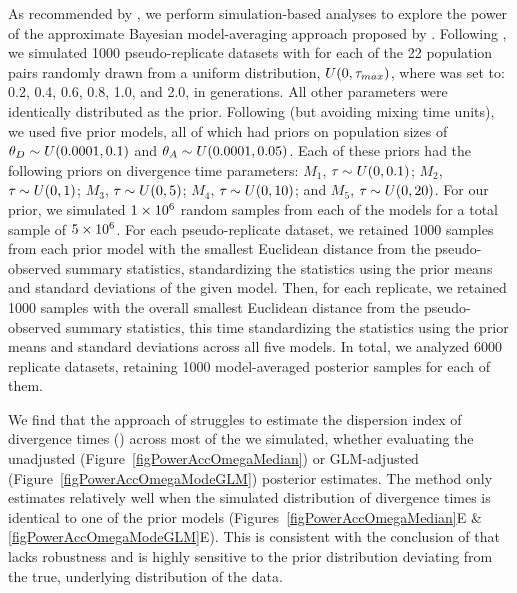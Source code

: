 \documentclass[letterpaper,12pt]{article}
\begin{document}
\begin{linenumbers}
As recommended by \citet{Oaks2012}, we perform simulation-based analyses
to explore the power of the approximate Bayesian model-averaging approach
proposed by \citet{Hickerson2013}.
Following \citet{Oaks2012}, we simulated 1000 pseudo-replicate datasets with
\divt{} for each of the 22 population pairs randomly drawn from a uniform
distribution, $U(0, \tau_{max})$, where  was set to: 0.2, 0.4, 0.6,
0.8, 1.0, and 2.0, in \globalcoalunit generations.
All other parameters were identically distributed as the prior.
Following \citet{Hickerson2013} (but avoiding mixing time units), we used five
prior models, all of which had priors on population sizes of
$\meanDescendantTheta{} \sim U(0.0001, 0.1)$ and $\ancestralTheta{} \sim
U(0.0001, 0.05)$.
Each of these priors had the following priors on divergence time parameters:
$M_1$, $\tau_{} \sim U(0, 0.1)$;
$M_2$, $\tau_{} \sim U(0, 1)$;
$M_3$, $\tau_{} \sim U(0, 5)$;
$M_4$, $\tau_{} \sim U(0, 10)$; and
$M_5$, $\tau_{} \sim U(0, 20)$.
For our prior, we simulated $1\times 10^{6}$ random samples from each of the models
for a total sample of $5\times 10^{6}$.
For each pseudo-replicate dataset, we retained 1000 samples from each prior
model with the smallest Euclidean distance from the pseudo-observed summary
statistics, standardizing the statistics using the prior means and standard
deviations of the given model.
Then, for each replicate, we retained 1000 samples with the overall
smallest Euclidean distance from the pseudo-observed summary statistics, this
time standardizing the statistics using the prior means and standard deviations
across all five models.
In total, we analyzed 6000 replicate datasets, retaining 1000 model-averaged
posterior samples for each of them.

We find that the approach of \citet{Hickerson2013} struggles to estimate the
dispersion index of divergence times (\vmratio{}) across most of the 
we simulated, whether evaluating the unadjusted
(Figure~\ref{figPowerAccOmegaMedian}) or GLM-adjusted
(Figure~\ref{figPowerAccOmegaModeGLM}) posterior estimates.
The method only estimates \vmratio{} relatively well when the simulated
distribution of divergence times is identical to one of the prior models
(Figures~\ref{figPowerAccOmegaMedian}E \& \ref{figPowerAccOmegaModeGLM}E).
This is consistent with the conclusion of \citet{Oaks2012} that \msb lacks
robustness and is highly sensitive to the prior distribution deviating from the
true, underlying distribution of the data.


\end{linenumbers}
\end{document}
